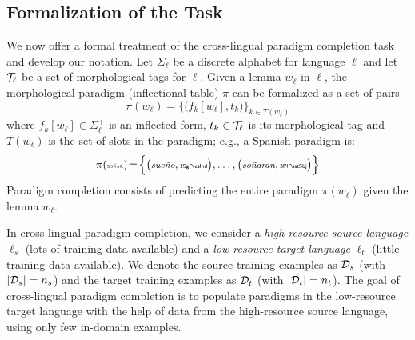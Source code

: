 \documentclass[11pt,letterpaper]{article}
\newcommand{\word}[1]{{\em #1}}
\newcommand{\mtag}[1]{{\small{\textsf{#1}}}}
\begin{document}
\subsection{Formalization of the Task}
We  now offer a formal treatment of the cross-lingual
paradigm completion task and develop our notation.
Let $\Sigma_\ell$ be a discrete alphabet for language $\ell$
and let ${\cal T_\ell}$ be a set of morphological tags for $\ell$.
Given a lemma $w_\ell$ in  $\ell$, the morphological paradigm (inflectional table) $\pi$
can be formalized as a set of pairs
\begin{equation}
  \pi(w_\ell) = \Big\{ \big( f_k[w_\ell], t_{k} \big) \Big\}_{k \in T(w_\ell)}
\end{equation}
where $f_k[w_\ell] \in \Sigma_\ell^+$ is an inflected form,
$t_{k} \in {\cal T_\ell}$ is its morphological tag and $T(w_\ell)$ is the
set of slots in the paradigm;
e.g., a  Spanish paradigm is:
\begin{equation*}
  \pi(\text{\tiny \sc so\~{n}ar})\!=\! \Big\{ \big(\text{\footnotesize \word{sue\~{n}o}}, \text{{\mtag{\tiny1SgPresInd}}} \big),\ldots,\big(\text{\footnotesize  \word{so\~{n}aran}}, \text{\mtag{\tiny3PlPastSbj}} \big)\Big\}
\end{equation*}
Paradigm
completion  consists of predicting the entire paradigm
$\pi(w_{\ell})$ given the lemma $w_{\ell}$. 

In cross-lingual paradigm completion, we consider a
\emph{high-resource source language} $\ell_s$ (lots
of training data available) and a \emph{low-resource target language}
$\ell_t$ (little training data available). We denote the source training examples
as ${\cal D}_s$ (with $|{\cal D}_s| = n_s$) and the target
training examples as ${\cal D}_t$ (with $|{\cal D}_t| = n_t$). The goal of
cross-lingual paradigm completion is to populate
paradigms in the low-resource target language with the help of
data from the high-resource source language, using only few in-domain examples.
\end{document}
